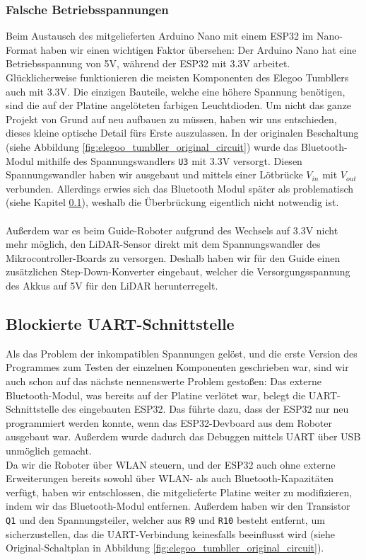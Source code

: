 \documentclass[12pt]{article}
\begin{document}
	\subsubsection{Falsche Betriebsspannungen}
	\label{problem_betriebsspannungen}
	Beim Austausch des mitgelieferten Arduino Nano mit einem ESP32 im Nano-Format haben wir einen wichtigen Faktor übersehen:
	Der Arduino Nano hat eine Betriebsspannung von 5V,
	während der ESP32 mit 3.3V arbeitet.
	Glücklicherweise funktionieren die meisten Komponenten des Elegoo Tumbllers auch mit 3.3V.
	Die einzigen Bauteile,
	welche eine höhere Spannung benötigen,
	sind die auf der Platine angelöteten farbigen Leuchtdioden.
	Um nicht das ganze Projekt von Grund auf neu aufbauen zu müssen,
	haben wir uns entschieden,
	dieses kleine optische Detail fürs Erste auszulassen.
	In der originalen Beschaltung (siehe Abbildung \ref{fig:elegoo_tumbller_original_circuit})
	wurde das Bluetooth-Modul mithilfe des Spannungswandlers \texttt{U3} mit 3.3V versorgt.
	Diesen Spannungswandler haben wir ausgebaut und mittels einer Lötbrücke $V_{in}$ mit $V_{out}$ verbunden.
	Allerdings erwies sich das Bluetooth Modul später als problematisch (siehe Kapitel \ref{problem_bluetooth_serial}),
	weshalb die Überbrückung eigentlich nicht notwendig ist.
	\\\\
	Außerdem war es beim Guide-Roboter aufgrund des Wechsels auf 3.3V nicht mehr möglich,
	den LiDAR-Sensor direkt mit dem Spannungswandler des Mikrocontroller-Boards zu versorgen.
	Deshalb haben wir für den Guide einen zusätzlichen Step-Down-Konverter eingebaut,
	welcher die Versorgungsspannung des Akkus auf 5V für den LiDAR herunterregelt.
	\subsection{Blockierte UART-Schnittstelle}
	\label{problem_bluetooth_serial}
	Als das Problem der inkompatiblen Spannungen gelöst,
	und die erste Version des Programmes zum Testen der einzelnen Komponenten geschrieben war,
	sind wir auch schon auf das nächste nennenswerte Problem gestoßen:
	Das externe Bluetooth-Modul,
	was bereits auf der Platine verlötet war,
	belegt die UART-Schnittstelle des eingebauten ESP32.
	Das führte dazu, dass der ESP32 nur neu programmiert werden konnte,
	wenn das ESP32-Devboard aus dem Roboter ausgebaut war.
	Außerdem wurde dadurch das Debuggen mittels UART über USB unmöglich gemacht.
	\\
	Da wir die Roboter über WLAN steuern,
	und der ESP32 auch ohne externe Erweiterungen bereits sowohl über WLAN- als auch Bluetooth-Kapazitäten verfügt,
	haben wir entschlossen,
	die mitgelieferte Platine weiter zu modifizieren,
	indem wir das Bluetooth-Modul entfernen.
	Außerdem haben wir den Transistor \texttt{Q1} und den Spannungsteiler,
	welcher aus \texttt{R9} und \texttt{R10} besteht entfernt,
	um sicherzustellen, das die UART-Verbindung keinesfalls beeinflusst wird
	(siehe Original-Schaltplan in Abbildung \ref{fig:elegoo_tumbller_original_circuit}).
\end{document}
